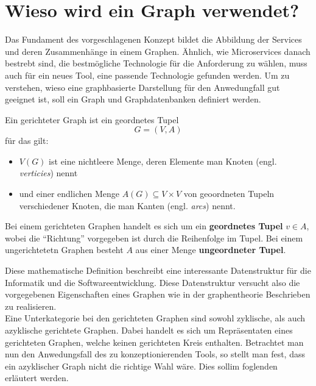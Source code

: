 \documentclass[
	12pt,
	BCOR=5mm,
	DIV=12,
	headinclude=on,
	footinclude=off,
	parskip=half,
	bibliography=totoc,
	listof=entryprefix,
	toc=listof,
	numbers=noenddot,
	plainfootsepline
]{scrreprt}
\begin{document}
\section{Wieso wird ein Graph verwendet?}

Das Fundament des vorgeschlagenen Konzept bildet die Abbildung der Services und deren Zusammenhänge in einem Graphen. Ähnlich, wie Microservices danach bestrebt sind, die bestmögliche Technologie für die Anforderung zu wählen, muss auch für ein neues Tool, eine passende Technologie gefunden werden. Um zu verstehen, wieso eine graphbasierte Darstellung für den Anwedungfall gut geeignet ist, soll ein Graph und Graphdatenbanken definiert werden.

\begin{definition}\autocite[Kapitel 1.2]{Bang-Jensen2007}
	Ein gerichteter Graph ist ein geordnetes Tupel $$G = (V,A)$$ für das gilt:
	\begin{itemize}
		\item $V(G)$ ist eine nichtleere Menge, deren Elemente man Knoten (engl. \textit{verticies}) nennt
		\item und einer endlichen Menge $A(G) \subseteq V \times V$ von geoordneten Tupeln verschiedener Knoten, die man Kanten (engl. \textit{arcs}) nennt.
	\end{itemize}

	Bei einem gerichteten Graphen handelt es sich um ein \textbf{geordnetes Tupel} $v \in A$, wobei die \enquote{Richtung} vorgegeben ist durch die Reihenfolge im Tupel. Bei einem ungerichtetetn Graphen besteht $A$ aus einer Menge \textbf{ungeordneter Tupel}.
\end{definition}

Diese mathematische Definition beschreibt eine interessante Datenstruktur für die Informatik und die Softwareentwicklung. Diese Datenstruktur versucht also die vorgegebenen Eigenschaften eines Graphen wie in der graphentheorie Beschrieben zu realisieren. \\
Eine Unterkategorie bei den gerichteten Graphen sind sowohl zyklische, als auch azyklische gerichtete Graphen. Dabei handelt es sich um Repräsentaten eines gerichteten Graphen, welche keinen gerichteten Kreis enthalten. Betrachtet man nun den Anwedungsfall des zu konzeptionierenden Tools, so stellt man fest, dass ein azyklischer Graph nicht die richtige Wahl wäre. Dies sollim foglenden erläutert werden.
\end{document}

